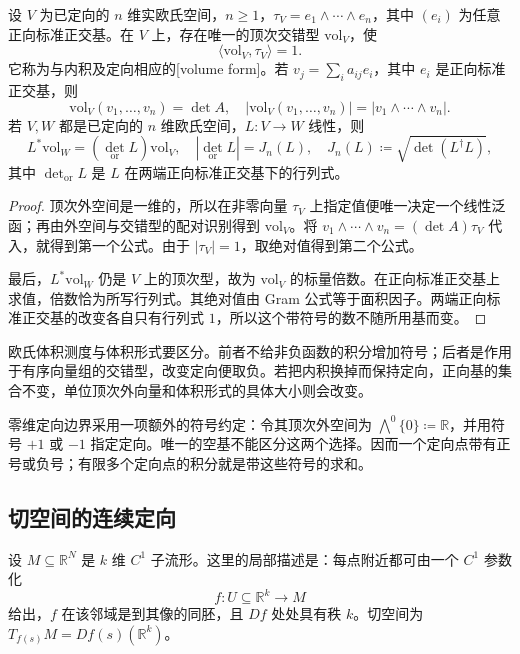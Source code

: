 \begin{proposition}\label{b1:prop:app-b-volume-form}
设 \(V\) 为已定向的 \(n\) 维实欧氏空间，\(n\ge1\)，\(\tau_V=e_1\wedge\cdots\wedge e_n\)，其中 \((e_i)\) 为任意正向标准正交基。在 \(V\) 上，存在唯一的顶次交错型 \(\mathrm{vol}_V\)，使
\[
 \langle\mathrm{vol}_V,\tau_V\rangle=1.
\]
它称为与内积及定向相应的[volume form]。若 \(v_j=\sum_i a_{ij}e_i\)，其中 \(e_i\) 是正向标准正交基，则
\[
 \mathrm{vol}_V(v_1,\ldots,v_n)=\det A,\quad
 \bigl|\mathrm{vol}_V(v_1,\ldots,v_n)\bigr|
       =|v_1\wedge\cdots\wedge v_n|.
\]
若 \(V,W\) 都是已定向的 \(n\) 维欧氏空间，\(L:V\rightarrow W\) 线性，则
\[
 L^*\mathrm{vol}_W=(\det_{\mathrm{or}}L)\mathrm{vol}_V,
 \quad
 |\det_{\mathrm{or}}L|=J_n(L),\quad J_n(L)\coloneqq\sqrt{\det(L^\dagger L)},
\]
其中 \(\det_{\mathrm{or}}L\) 是 \(L\) 在两端正向标准正交基下的行列式。
\end{proposition}
\begin{proof}
顶次外空间是一维的，所以在非零向量 \(\tau_V\) 上指定值便唯一决定一个线性泛函；再由外空间与交错型的配对识别得到 \(\mathrm{vol}_V\)。将
\(v_1\wedge\cdots\wedge v_n=(\det A)\tau_V\) 代入，就得到第一个公式。由于 \(|\tau_V|=1\)，取绝对值得到第二个公式。

最后，\(L^*\mathrm{vol}_W\) 仍是 \(V\) 上的顶次型，故为 \(\mathrm{vol}_V\) 的标量倍数。在正向标准正交基上求值，倍数恰为所写行列式。其绝对值由 Gram 公式等于面积因子。两端正向标准正交基的改变各自只有行列式 \(1\)，所以这个带符号的数不随所用基而变。
\end{proof}

欧氏体积测度与体积形式要区分。前者不给非负函数的积分增加符号；后者是作用于有序向量组的交错型，改变定向便取负。若把内积换掉而保持定向，正向基的集合不变，单位顶次外向量和体积形式的具体大小则会改变。

\ProseParagraphBreak

零维定向边界采用一项额外的符号约定：令其顶次外空间为 \(\bigwedge^0\{0\}\coloneqq\mathbb R\)，并用符号 \(+1\) 或 \(-1\) 指定定向。唯一的空基不能区分这两个选择。因而一个定向点带有正号或负号；有限多个定向点的积分就是带这些符号的求和。

\subsection{切空间的连续定向}
\label{b1:subsec:B10502}

设 \(M\subseteq\mathbb R^N\) 是 \(k\) 维 \(C^1\) 子流形。这里的局部描述是：每点附近都可由一个 \(C^1\) 参数化
\[
 f:U\subseteq\mathbb R^k\longrightarrow M
\]
给出，\(f\) 在该邻域是到其像的同胚，且 \(Df\) 处处具有秩 \(k\)。切空间为 \(T_{f(s)}M=Df(s)(\mathbb R^k)\)。

